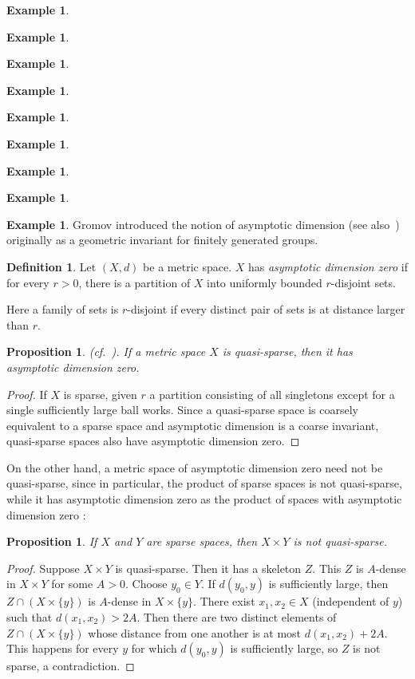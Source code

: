 \documentclass[12pt]{amsart}
\newtheorem{proposition}[theorem]{Proposition}
\theoremstyle{definition}
\newtheorem{definition}[theorem]{Definition}
\newtheorem{example}[theorem]{Example}
\theoremstyle{remark}
\numberwithin{equation}{section}
\begin{document}
\begin{example}
\begin{example}
\begin{example}
\begin{example}
\begin{example}
\begin{example}
\begin{example}
\begin{example}
\begin{example}
Gromov \cite{G} introduced the notion of asymptotic dimension
(see also~\cite{BD})
originally as a geometric invariant for finitely generated groups.

\begin{definition}
Let $(X,d)$ be a metric space. $X$ has {\em asymptotic dimension zero}
if for every $r > 0$, there is a partition of $X$ into uniformly
bounded $r$-disjoint sets.
\end{definition}

Here a family of sets is $r$-disjoint if every distinct pair of sets
is at distance larger than $r$.

\begin{proposition}\label{qs-ad0}
{\rm (cf.~\cite{P}).}
If a metric space $X$ is quasi-sparse, then it has asymptotic
dimension zero.
\end{proposition}

\begin{proof}
If $X$ is sparse, given $r$ a partition consisting of all singletons
except for a single sufficiently large ball works. Since a
quasi-sparse space is coarsely equivalent to a sparse space and
asymptotic dimension is a coarse invariant, quasi-sparse spaces also
have asymptotic dimension zero.
\end{proof}

On the other hand, a metric space of asymptotic dimension zero need
not be quasi-sparse, since in particular, the product of sparse spaces
is not quasi-sparse, while it has asymptotic dimension zero as the
product of spaces with asymptotic dimension zero \cite{BD}:

\begin{proposition}\label{prod}
If $X$ and $Y$ are sparse spaces, then $X\times Y$ is not
quasi-sparse.
\end{proposition}

\begin{proof}
Suppose $X\times Y$ is quasi-sparse. Then it has a skeleton $Z.$ This
$Z$ is $A$-dense in $X\times Y$ for some $A>0.$ Choose $y_0\in Y.$ If
$d(y_0,y)$ is sufficiently large, then $Z\cap (X\times \{y\})$ is
$A$-dense in $X\times \{y\}.$ There exist $x_1, x_2\in X$ (independent
of $y$) such that $d(x_1,x_2)>2A.$ Then there are two distinct
elements of $Z\cap(X\times \{y\})$ whose distance from one another is
at most $d(x_1,x_2)+2A.$ This happens for every $y$ for which
$d(y_0,y)$ is sufficiently large, so $Z$ is not sparse, a
contradiction.
\end{proof}



\end{example}
\end{example}
\end{example}
\end{example}
\end{example}
\end{example}
\end{example}
\end{example}
\end{example}
\end{document}
